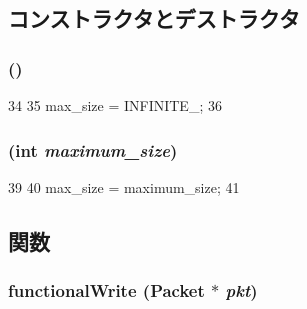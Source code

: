 \subsection{コンストラクタとデストラクタ}
\hypertarget{classflitBuffer__d_aec002f999eebe139ec46bd4642d12650}{
\subsubsection[{flitBuffer\_\-d}]{ ()}}
\label{classflitBuffer__d_aec002f999eebe139ec46bd4642d12650}



\begin{DoxyCode}
34 {
35     max_size = INFINITE_;
36 }
\end{DoxyCode}
\hypertarget{classflitBuffer__d_a238ead513351dcf50c43b7a14ed25733}{
\subsubsection[{flitBuffer\_\-d}]{ (int {\em maximum\_\-size})}}
\label{classflitBuffer__d_a238ead513351dcf50c43b7a14ed25733}



\begin{DoxyCode}
39 {
40     max_size = maximum_size;
41 }
\end{DoxyCode}


\subsection{関数}
\hypertarget{classflitBuffer__d_ad07b9def1d6f5e5f988a254c3a9d1ad9}{
\subsubsection[{functionalWrite}]{ functionalWrite ({\bf Packet} $\ast$ {\em pkt})}}
\label{classflitBuffer__d_ad07b9def1d6f5e5f988a254c3a9d1ad9}



